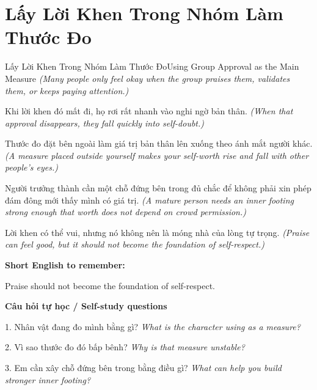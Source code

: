 \section{Lấy Lời Khen Trong Nhóm Làm Thước Đo}
\begin{truyen}{Lấy Lời Khen Trong Nhóm Làm Thước Đo}{Using Group Approval as the Main Measure}
\textit{(Many people only feel okay when the group praises them, validates them, or keeps paying attention.)}

Khi lời khen đó mất đi, họ rơi rất nhanh vào nghi ngờ bản thân.
\textit{(When that approval disappears, they fall quickly into self-doubt.)}

Thước đo đặt bên ngoài làm giá trị bản thân lên xuống theo ánh mắt người khác.
\textit{(A measure placed outside yourself makes your self-worth rise and fall with other people’s eyes.)}

Người trưởng thành cần một chỗ đứng bên trong đủ chắc để không phải xin phép đám đông mới thấy mình có giá trị.
\textit{(A mature person needs an inner footing strong enough that worth does not depend on crowd permission.)}

\end{truyen}

\begin{baihoc}
Lời khen có thể vui, nhưng nó không nên là móng nhà của lòng tự trọng.
\textit{(Praise can feel good, but it should not become the foundation of self-respect.)}
\end{baihoc}

\begin{ghinhoanh}
\textbf{Short English to remember:}

Praise should not become the foundation of self-respect.

\end{ghinhoanh}

\begin{tuhocnhanh}
\textbf{Câu hỏi tự học / Self-study questions}

1. Nhân vật đang đo mình bằng gì? \textit{What is the character using as a measure?}

2. Vì sao thước đo đó bấp bênh? \textit{Why is that measure unstable?}

3. Em cần xây chỗ đứng bên trong bằng điều gì? \textit{What can help you build stronger inner footing?}
\end{tuhocnhanh}
\ngancach

